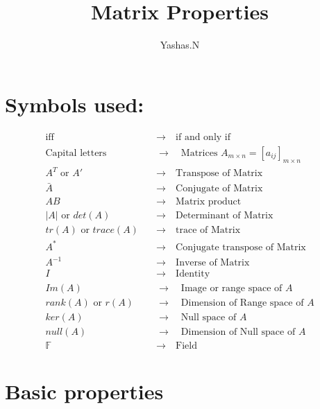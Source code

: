 \documentclass[11pt]{extarticle}
\author{Yashas.N}
\title{Matrix Properties}
\date{}
\newcommand{\w}[1]{\text{#1}}
\begin{document}
	\maketitle
	\boldmath
	
\begin{multicols}{2}
\section*{Symbols used:}
{\scriptsize 
	\begin{align*}
	\text{iff} \quad&\rightarrow\quad\text{if and only if}\\
	\text{Capital letters}\quad&\rightarrow\quad\text{Matrices }A_{m\times n}=[a_{ij}]_{m \times n}\\
	A^T \text{ or } A'\quad&\rightarrow\quad\text{Transpose of Matrix}\\
	\bar{A}\quad&\rightarrow\quad\text{Conjugate of Matrix}\\
	AB\quad&\rightarrow\quad\text{Matrix product}\\
	|A|\text{ or } det(A) \quad&\rightarrow\quad\text{Determinant of Matrix}\\
	tr(A)\text{ or }trace(A) \quad&\rightarrow\quad\text{trace of Matrix}\\
	A^*\quad&\rightarrow\quad\text{Conjugate transpose of Matrix}\\
	A^{-1} \quad&\rightarrow\quad\text{Inverse of Matrix}\\
	I \quad&\rightarrow\quad\text{Identity}\\
	Im(A) \quad&\rightarrow\quad \text{Image or range space of }A\\
	rank(A)\w{ or } r(A)\quad&\rightarrow\quad \text{Dimension of Range space of }A\\
	ker(A) \quad&\rightarrow\quad \text{Null space of }A\\
	null(A) \quad&\rightarrow\quad \text{Dimension of Null space of }A\\ 
	\mathbb{F}  \quad&\rightarrow\quad \text{Field}
\end{align*}}


\section{Basic properties}


\end{multicols}
\end{document}
